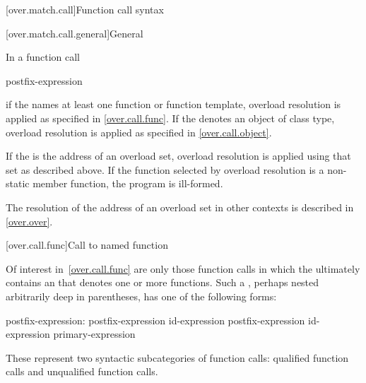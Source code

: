 [over.match.call]{Function call syntax}%

[over.match.call.general]{General}%

\pnum
In a function call
\begin{ncsimplebnf}
postfix-expression \terminal{(}  \terminal{)}
\end{ncsimplebnf}
if the  names at least one function or
function template,
overload resolution is applied as specified in \ref{over.call.func}.
If the  denotes an object of class type, overload
resolution is applied as specified in \ref{over.call.object}.

\pnum
If the  is the address of an overload set,
overload resolution is applied using that set as described above.
If the function selected by overload resolution is a non-static member function,
the program is ill-formed.
\begin{note}
The resolution of the address of an
overload set in other contexts is described in \ref{over.over}.
\end{note}

[over.call.func]{Call to named function}

\pnum
Of interest in~\ref{over.call.func} are only those function calls in
which the 
ultimately contains an  that
denotes one or more functions.
Such a
,
perhaps nested arbitrarily deep in
parentheses, has one of the following forms:

\begin{ncbnf}
postfix-expression:\br
    postfix-expression  id-expression\br
    postfix-expression \terminal{->} id-expression\br
    primary-expression
\end{ncbnf}

These represent two syntactic subcategories of function calls:
qualified function calls and unqualified function calls.

